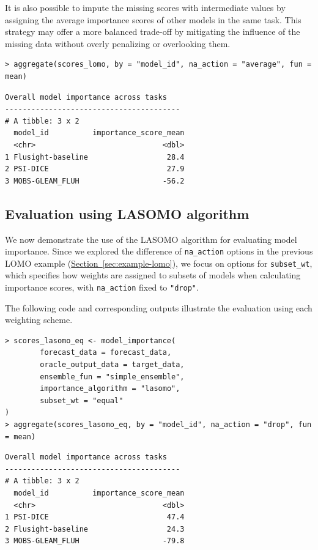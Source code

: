 \documentclass[
  article,
  shortnames,
  notitle]{jss}
\begin{document}
It is also possible to impute the missing scores with intermediate
values by assigning the average importance scores of other models in the
same task. This strategy may offer a more balanced trade-off by
mitigating the influence of the missing data without overly penalizing
or overlooking them.

\begin{verbatim}
> aggregate(scores_lomo, by = "model_id", na_action = "average", fun = mean) 
\end{verbatim}

\small

\begin{verbatim}
Overall model importance across tasks
---------------------------------------- 
# A tibble: 3 x 2
  model_id          importance_score_mean
  <chr>                             <dbl>
1 Flusight-baseline                  28.4
2 PSI-DICE                           27.9
3 MOBS-GLEAM_FLUH                   -56.2
\end{verbatim}

\normalsize

\subsection{Evaluation using LASOMO algorithm}\label{sec:example-lasomo}

We now demonstrate the use of the LASOMO algorithm for evaluating model
importance. Since we explored the difference of \texttt{na\_action}
options in the previous LOMO example
(\hyperref[sec:example-lomo]{Section~\ref{sec:example-lomo}}), we focus
on options for \texttt{subset\_wt}, which specifies how weights are
assigned to subsets of models when calculating importance scores, with
\texttt{na\_action} fixed to \texttt{"drop"}.

The following code and corresponding outputs illustrate the evaluation
using each weighting scheme.

\begin{verbatim}
> scores_lasomo_eq <- model_importance(
        forecast_data = forecast_data,
        oracle_output_data = target_data,
        ensemble_fun = "simple_ensemble",
        importance_algorithm = "lasomo",
        subset_wt = "equal"
)
> aggregate(scores_lasomo_eq, by = "model_id", na_action = "drop", fun = mean)
\end{verbatim}

\small

\begin{verbatim}
Overall model importance across tasks
---------------------------------------- 
# A tibble: 3 x 2
  model_id          importance_score_mean
  <chr>                             <dbl>
1 PSI-DICE                           47.4
2 Flusight-baseline                  24.3
3 MOBS-GLEAM_FLUH                   -79.8
\end{verbatim}
\end{document}
